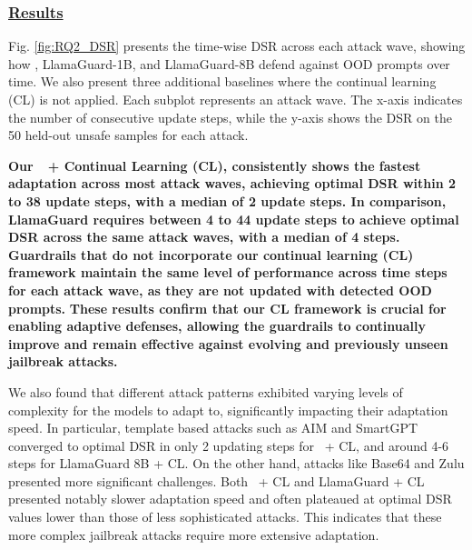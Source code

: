 

\subsubsection*{\underline{\textbf{Results}}}
Fig. \ref{fig:RQ2_DSR} presents the time-wise DSR across each attack wave, showing how \ourapp, LlamaGuard-1B, and LlamaGuard-8B defend against OOD prompts over time.
We also present three additional baselines where the continual learning (CL) is not applied.
Each subplot represents an attack wave. The x-axis indicates the number of consecutive update steps, while the y-axis shows the DSR on the 50 held-out unsafe samples for each attack.

\textbf{Our~\ourapp~+ Continual Learning (CL), consistently shows the fastest adaptation across most attack waves, achieving optimal DSR within 2 to 38 update steps, with a median of 2 update steps.
In comparison, LlamaGuard requires between 4 to 44 update steps to achieve optimal DSR across the same attack waves, with a median of 4 steps. Guardrails that do not incorporate our continual learning (CL) framework maintain the same level of performance across time steps for each attack wave, as they are not updated with detected OOD prompts.}
\textbf{These results confirm that our CL framework is crucial for enabling adaptive defenses, allowing the guardrails to continually improve and remain effective against evolving and previously unseen jailbreak attacks.}

We also found that different attack patterns exhibited varying levels of complexity for the models to adapt to, significantly impacting their adaptation speed.
In particular, template based attacks such as AIM and SmartGPT converged to optimal DSR in only 2 updating steps for \ourapp~+ CL, and around 4-6 steps for LlamaGuard 8B + CL. 
On the other hand, attacks like Base64 and Zulu presented more significant challenges. Both ~\ourapp + CL and LlamaGuard + CL presented notably slower adaptation speed and often plateaued at optimal DSR values lower than those of less sophisticated attacks.
This indicates that these more complex jailbreak attacks require more extensive adaptation.


